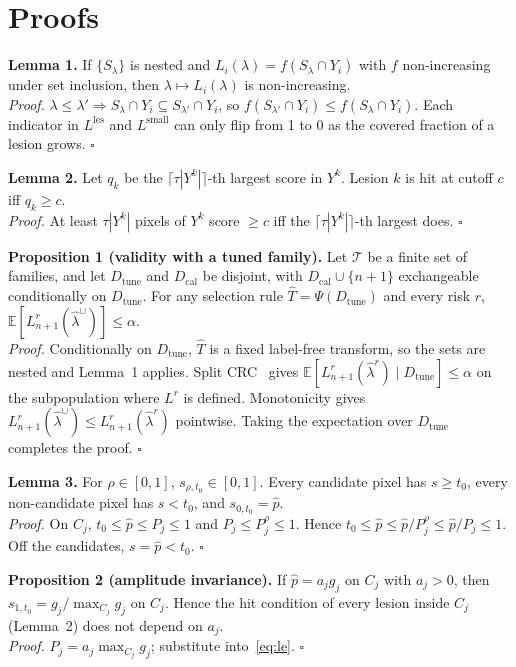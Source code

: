 \section{Proofs}\label{app:proofs}

\noindent\textbf{Lemma 1.} If $\{S_\lambda\}$ is nested and
$L_i(\lambda)=f(S_\lambda\cap Y_i)$ with $f$ non-increasing under set inclusion, then
$\lambda\mapsto L_i(\lambda)$ is non-increasing.\\
\emph{Proof.} $\lambda\le\lambda'\Rightarrow S_\lambda\cap Y_i\subseteq S_{\lambda'}\cap Y_i$, so
$f(S_{\lambda'}\cap Y_i)\le f(S_\lambda\cap Y_i)$. Each indicator in $L^{\mathrm{les}}$ and
$L^{\mathrm{small}}$ can only flip from 1 to 0 as the covered fraction of a lesion grows. $\square$

\medskip\noindent\textbf{Lemma 2.} Let $q_k$ be the $\lceil\tau|Y^k|\rceil$-th largest score in $Y^k$.
Lesion $k$ is hit at cutoff $c$ iff $q_k\ge c$.\\
\emph{Proof.} At least $\tau|Y^k|$ pixels of $Y^k$ score $\ge c$ iff the
$\lceil\tau|Y^k|\rceil$-th largest does. $\square$

\medskip\noindent\textbf{Proposition 1 (validity with a tuned family).} Let $\mathcal T$ be a finite
set of families, and let $D_{\mathrm{tune}}$ and $D_{\mathrm{cal}}$ be disjoint, with
$D_{\mathrm{cal}}\cup\{n{+}1\}$ exchangeable conditionally on $D_{\mathrm{tune}}$. For any selection
rule $\hat T=\Psi(D_{\mathrm{tune}})$ and every risk $r$,
$\mathbb E[L^r_{n+1}(\hat\lambda^\cup)]\le\alpha$.\\
\emph{Proof.} Conditionally on $D_{\mathrm{tune}}$, $\hat T$ is a fixed label-free transform, so the
sets are nested and Lemma~1 applies. Split CRC~\cite{angelopoulos2024crc} gives
$\mathbb E[L^r_{n+1}(\hat\lambda^r)\mid D_{\mathrm{tune}}]\le\alpha$ on the subpopulation where $L^r$ is
defined. Monotonicity gives $L^r_{n+1}(\hat\lambda^\cup)\le L^r_{n+1}(\hat\lambda^r)$ pointwise. Taking
the expectation over $D_{\mathrm{tune}}$ completes the proof. $\square$

\medskip\noindent\textbf{Lemma 3.} For $\rho\in[0,1]$, $s_{\rho,t_0}\in[0,1]$. Every candidate pixel has
$s\ge t_0$, every non-candidate pixel has $s<t_0$, and $s_{0,t_0}=\hat p$.\\
\emph{Proof.} On $C_j$, $t_0\le\hat p\le P_j\le 1$ and $P_j\le P_j^\rho\le 1$. Hence
$t_0\le\hat p\le\hat p/P_j^\rho\le\hat p/P_j\le 1$. Off the candidates, $s=\hat p<t_0$. $\square$

\medskip\noindent\textbf{Proposition 2 (amplitude invariance).} If $\hat p=a_jg_j$ on $C_j$ with $a_j>0$,
then $s_{1,t_0}=g_j/\max_{C_j}g_j$ on $C_j$. Hence the hit condition of every lesion inside $C_j$
(Lemma~2) does not depend on $a_j$.\\
\emph{Proof.} $P_j=a_j\max_{C_j}g_j$; substitute into~\eqref{eq:le}. $\square$

